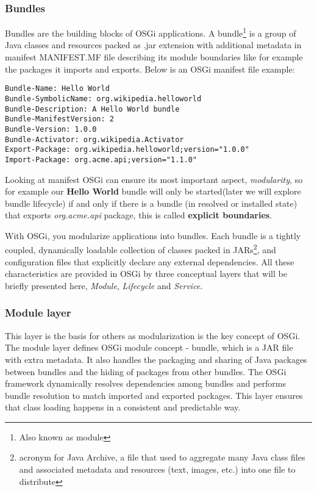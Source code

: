 \subsubsection{Bundles}
Bundles are the building blocks of OSGi applications. A bundle\footnote{Also known as module} is a group of Java classes and resources packed as .jar extension with additional metadata in manifest MANIFEST.MF file describing its module boundaries like for example the packages it imports and exports. Below is an OSGi manifest file example:

\begin{lstlisting}
Bundle-Name: Hello World
Bundle-SymbolicName: org.wikipedia.helloworld
Bundle-Description: A Hello World bundle
Bundle-ManifestVersion: 2
Bundle-Version: 1.0.0
Bundle-Activator: org.wikipedia.Activator
Export-Package: org.wikipedia.helloworld;version="1.0.0"
Import-Package: org.acme.api;version="1.1.0"
\end{lstlisting} 
\FloatBarrier

Looking at manifest OSGi can ensure its most important aspect, \emph{modularity}, so for example our \textbf{Hello World} bundle will only be started(later we will explore bundle lifecycle) if and only if there is a bundle (in resolved or installed state) that exports \emph{org.acme.api} package, this is called \textbf{explicit boundaries}.

With OSGi, you modularize applications into bundles. Each bundle is a tightly coupled, dynamically loadable collection of classes packed in JARs\footnote{acronym for Java Archive, a file that used to aggregate many Java class files and associated metadata and resources (text, images, etc.) into one file to distribute}, and configuration files that explicitly declare any external dependencies. All these characteristics are provided in OSGi by three conceptual layers that will be briefly presented here, \emph{Module}, \emph{Lifecycle} and \emph{Service}.

\subsubsection{Module layer}
This layer is the basis for others as modularization is the key concept of OSGi. The module layer defines OSGi module concept - bundle, which is a JAR file with extra metadata. It also handles the packaging and sharing of Java packages between bundles and the hiding of packages from other bundles. The OSGi framework dynamically resolves dependencies among bundles and performs bundle resolution to match imported and exported packages. This layer ensures that class loading happens in a consistent and predictable way.

